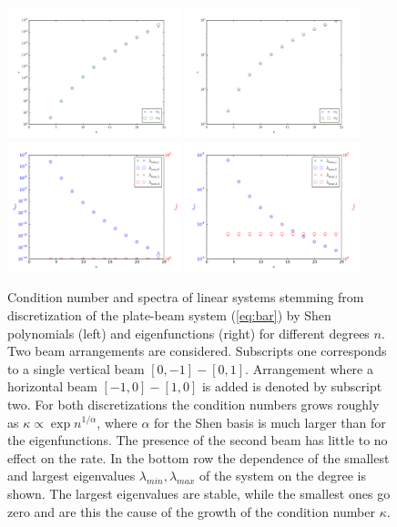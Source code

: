 \documentclass{marine_2015}
\begin{document}
 \begin{figure}[t!]
 \centering
 \includegraphics[width=0.45\textwidth]{img/shen_cond}
 \includegraphics[width=0.45\textwidth]{img/sine_cond}\\
 \includegraphics[width=0.45\textwidth]{img/shen_spectrum}
 \includegraphics[width=0.45\textwidth]{img/sine_spectrum}\\
 \caption{Condition number and spectra of linear systems stemming from
 discretization of the plate-beam system (\ref{eq:bar}) by Shen polynomials
 (left) and eigenfunctions (right) for different degrees $n$. Two beam arrangements 
 are considered. Subscripts one corresponds to a single vertical beam
 $\left[0, -1\right]-\left[0, 1\right]$. Arrangement where a horizontal beam 
$\left[-1, 0\right]-\left[1, 0\right]$ is added is denoted by subscript two.
For both discretizations the condition numbers grows roughly as
$\kappa\propto\exp{n^{1/\alpha}}$, where $\alpha$ for the Shen basis is much
larger than for the eigenfunctions. The presence of the second beam has little to
no effect on the rate. In the bottom row the dependence of the smallest and largest
eigenvalues $\lambda_{min}, \lambda_{max}$ of the system on the degree is shown. 
The largest eigenvalues are stable, while the smallest ones go zero and are this 
the cause of the growth of the condition number $\kappa$.
 }
 \label{fig:no_precon}
 \end{figure}
\end{document}
